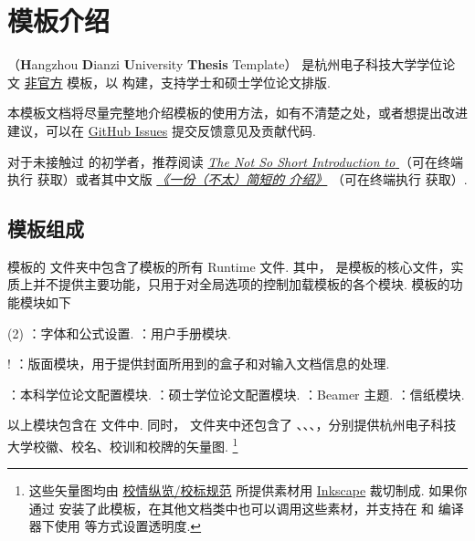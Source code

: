 \section{ 模板介绍}

（\textbf Hangzhou \textbf Dianzi \textbf University  \textbf{Thesis} Template） 是杭州电子科技大学学位论文 \underline{非官方}  模板，以  构建，支持学士和硕士学位论文排版.

本模板文档将尽量完整地介绍模板的使用方法，如有不清楚之处，或者想提出改进建议，可以在 \href{https://github.com/myhsia/hduthesis/issues}{GitHub Issues} 提交反馈意见及贡献代码.

对于未接触过  的初学者，推荐阅读
\href{https://tug.ctan.org/info/lshort/english/lshort.pdf}
  {\emph{The Not So Short Introduction to }}
（可在终端执行  获取）或者其中文版
\href{http://mirrors.ctan.org/info/lshort/chinese/lshort-zh-cn.pdf}
  {\emph{《一份（不太）简短的  介绍》}}
（可在终端执行  获取）.

\subsection{模板组成}

 模板的  文件夹中包含了模板的所有 Runtime 文件.
其中， 是模板的核心文件，实质上并不提供主要功能，只用于对全局选项的控制加载模板的各个模块. 模板的功能模块如下

\begin{tasks}(2)
  \task {}：字体和公式设置.
  \task {}：用户手册模块.
  \addtocounter{task}{5}
  \task! ：版面模块，用于提供封面所用到的盒子和对输入文档信息的处理.
  \addtocounter{task}{-6}
  \task {}：本科学位论文配置模块.
  \task {}：硕士学位论文配置模块.
  \task {}：Beamer 主题.
  \task {}：信纸模块.
\end{tasks}

以上模块包含在  文件中.
同时， 文件夹中还包含了 、、、，分别提供杭州电子科技大学校徽、校名、校训和校牌的矢量图.
\footnote
  {
    这些矢量图均由 \href{https://www.hdu.edu.cn/666/list.htm}{校情纵览/校标规范} 所提供素材用 \href{https://inkscape.org}{Inkscape} 裁切制成. 如果你通过  安装了此模板，在其他文档类中也可以调用这些素材，并支持在  和  编译器下使用  等方式设置透明度.
  }

